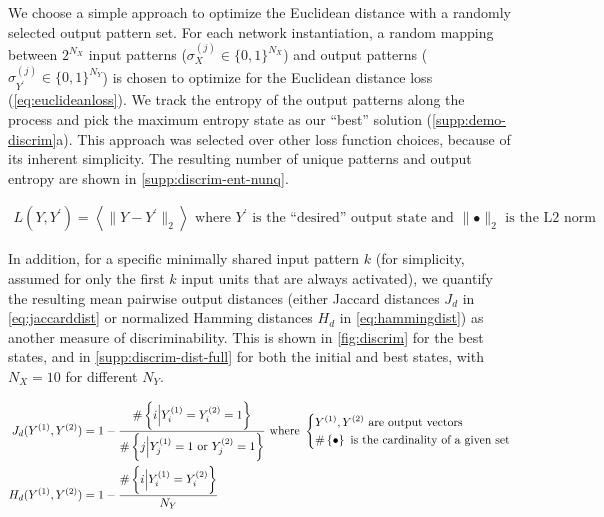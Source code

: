 We choose a simple approach to optimize the Euclidean distance with a randomly selected output pattern set.
For each network instantiation,
    a random mapping between $2^{N_X}$ input patterns ($\sigma_X^{(j)} \in \{0,1\}^{N_X}$)
        and output patterns ($\sigma_{Y^\prime}^{(j)} \in \{0,1\}^{N_Y}$)
    is chosen to optimize for the Euclidean distance loss (\autoref{eq:euclideanloss}).
We track the entropy of the output patterns along the process
    and pick the maximum entropy state as our ``best'' solution (\autoref{supp:demo-discrim}a).
    This approach was selected over other loss function choices, because of its inherent simplicity.
    The resulting number of unique patterns and output entropy are shown in \autoref{supp:discrim-ent-nunq}.

\vspace{-1em}
\begin{align}
    L(Y, Y^{\prime}) = \left \langle \lVert Y - Y^{\prime} \rVert_2 \right \rangle
    \text{ where } Y^{\prime} \text{ is the ``desired'' output state}
    \text{ and } \lVert \bullet \rVert_2 \text{ is the L2 norm}
    \label{eq:euclideanloss}
\end{align}

In addition, for a specific minimally shared input pattern $k$
        (for simplicity, assumed for only the first $k$ input units that are always activated),
        we quantify the resulting mean pairwise output distances
        (either Jaccard distances $J_d$ in \autoref{eq:jaccarddist}
        or normalized Hamming distances $H_d$ in \autoref{eq:hammingdist})
        as another measure of discriminability.
    This is shown in \autoref{fig:discrim} for the best states,
        and in \autoref{supp:discrim-dist-full} for both the initial and best states,
        with $N_X=10$ for different $N_Y$.

\vspace{-1em}
\begin{align}
    J_d(Y^{(1)}, Y^{(2)}) &= 1 -
        \frac{
            \# \left\{
                i \Big| Y^{(1)}_i = Y^{(2)}_i = 1
                \right\}
        }{
            \# \left\{
                j \Big| Y^{(1)}_j = 1 \text{ or } Y^{(2)}_j = 1
                \right\}
        }
        \text{ where }
        \begin{dcases}
            Y^{(1)}, Y^{(2)} \text{ are output vectors}
            \\
            \# \left\{\bullet\right\}
            \text{ is the cardinality of a given set}
        \end{dcases}
    \label{eq:jaccarddist}
    \\
    H_d(Y^{(1)}, Y^{(2)}) &= 1 -
        \frac{
            \# \left\{
                i \Big| Y^{(1)}_i = Y^{(2)}_i
                \right\}
        }{
            N_Y
        }
    \label{eq:hammingdist}
\end{align}


